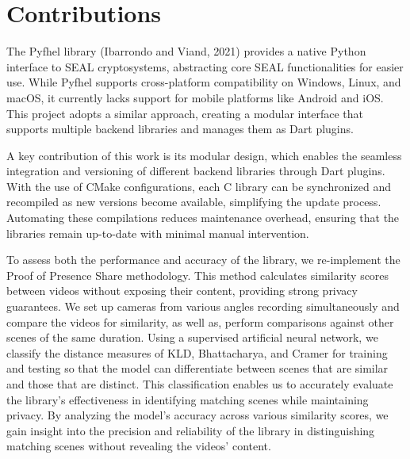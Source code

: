 \section{Contributions}
The Pyfhel library (Ibarrondo and Viand, 2021) provides a native Python interface to SEAL cryptosystems, abstracting core SEAL functionalities for easier use. While Pyfhel supports cross-platform compatibility on Windows, Linux, and macOS, it currently lacks support for mobile platforms like Android and iOS. This project adopts a similar approach, creating a modular interface that supports multiple backend libraries and manages them as Dart plugins.

A key contribution of this work is its modular design, which enables the seamless integration and versioning of different backend libraries through Dart plugins. With the use of CMake configurations, each C library can be synchronized and recompiled as new versions become available, simplifying the update process. Automating these compilations reduces maintenance overhead, ensuring that the libraries remain up-to-date with minimal manual intervention.

To assess both the performance and accuracy of the library, we re-implement the Proof of Presence Share methodology. This method calculates similarity scores between videos without exposing their content, providing strong privacy guarantees. We set up cameras from various angles recording simultaneously and compare the videos for similarity, as well as, perform comparisons against other scenes of the same duration. Using a supervised artificial neural network, we classify the distance measures of KLD, Bhattacharya, and Cramer for training and testing so that the model can differentiate between scenes that are similar and those that are distinct. This classification enables us to accurately evaluate the library's effectiveness in identifying matching scenes while maintaining privacy. By analyzing the model’s accuracy across various similarity scores, we gain insight into the precision and reliability of the library in distinguishing matching scenes without revealing the videos’ content.
